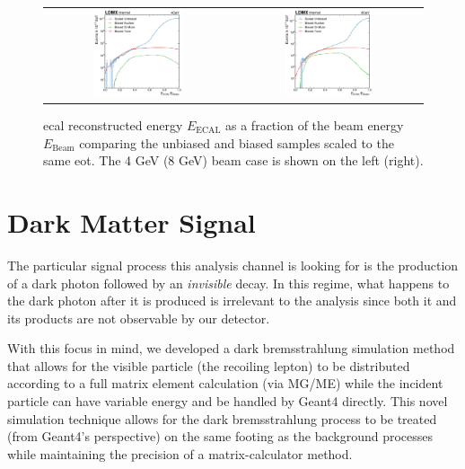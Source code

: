 \begin{figure}
  \centering
  \begin{tabular}{cc}
    \includegraphics[width=0.49\textwidth]{figures/ldmx/simulation/unbiased-biased-comp-4gev.pdf}
    &
    \includegraphics[width=0.49\textwidth]{figures/ldmx/simulation/unbiased-biased-comp-8gev.pdf}
  \end{tabular}
  \caption{\ac{ecal} reconstructed energy $E_\text{ECAL}$ as a fraction of the beam energy
  $E_\text{Beam}$ comparing the unbiased and biased samples scaled to the same \ac{eot}.
  The 4 GeV (8 GeV) beam case is shown on the left (right).}
  \label{fig:unbiased-biased-comp}
\end{figure}

\section{Dark Matter Signal}
The particular signal process this analysis channel is looking for is the production of a dark
photon followed by an \emph{invisible} decay. In this regime, what happens to the dark photon after
it is produced is irrelevant to the analysis since both it and its products are not observable by
our detector.

With this focus in mind, we developed a dark bremsstrahlung simulation method that allows for the
visible particle (the recoiling lepton) to be distributed according to a full matrix element
calculation (via MG/ME) while the incident particle can have variable energy and be handled by Geant4
directly. This novel simulation technique allows for the dark bremsstrahlung process to be treated
(from Geant4's perspective) on the same footing as the background processes while maintaining the
precision of a matrix-calculator method.

